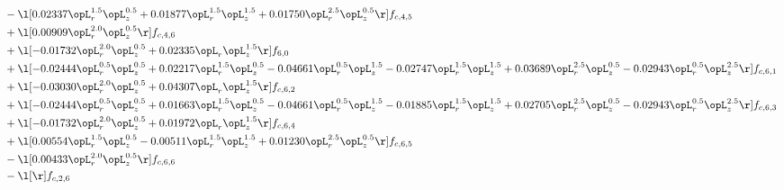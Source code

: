 \begin{alignat}{2}
& - \l[  0.02337 \opL_r^{1.5} \opL_z^{0.5} +  0.01877 \opL_r^{1.5} \opL_z^{1.5} +  0.01750 \opL_r^{2.5} \opL_z^{0.5}  \r] f_{c,4,5} \nonumber \\ 
& + \l[  0.00909 \opL_r^{2.0} \opL_z^{0.5}  \r] f_{c,4,6} \nonumber \\ 
& + \l[  -0.01732 \opL_r^{2.0} \opL_z^{0.5} +  0.02335 \opL_r \opL_z^{1.5}  \r] f_{6,0} \nonumber \\ 
& + \l[  -0.02444 \opL_r^{0.5} \opL_z^{0.5} +  0.02217 \opL_r^{1.5} \opL_z^{0.5}   -0.04661 \opL_r^{0.5} \opL_z^{1.5}   -0.02747 \opL_r^{1.5} \opL_z^{1.5} +  0.03689 \opL_r^{2.5} \opL_z^{0.5}   -0.02943 \opL_r^{0.5} \opL_z^{2.5}  \r] f_{c,6,1} \nonumber \\ 
& + \l[  -0.03030 \opL_r^{2.0} \opL_z^{0.5} +  0.04307 \opL_r \opL_z^{1.5}  \r] f_{c,6,2} \nonumber \\ 
& + \l[  -0.02444 \opL_r^{0.5} \opL_z^{0.5} +  0.01663 \opL_r^{1.5} \opL_z^{0.5}   -0.04661 \opL_r^{0.5} \opL_z^{1.5}   -0.01885 \opL_r^{1.5} \opL_z^{1.5} +  0.02705 \opL_r^{2.5} \opL_z^{0.5}   -0.02943 \opL_r^{0.5} \opL_z^{2.5}  \r] f_{c,6,3} \nonumber \\ 
& + \l[  -0.01732 \opL_r^{2.0} \opL_z^{0.5} +  0.01972 \opL_r \opL_z^{1.5}  \r] f_{c,6,4} \nonumber \\ 
& + \l[  0.00554 \opL_r^{1.5} \opL_z^{0.5}   -0.00511 \opL_r^{1.5} \opL_z^{1.5} +  0.01230 \opL_r^{2.5} \opL_z^{0.5}  \r] f_{c,6,5} \nonumber \\ 
& - \l[  0.00433 \opL_r^{2.0} \opL_z^{0.5}  \r] f_{c,6,6} \nonumber \\ 
& - \l[  \r] f_{c,2,6} \nonumber \\ 
\end{alignat} 


